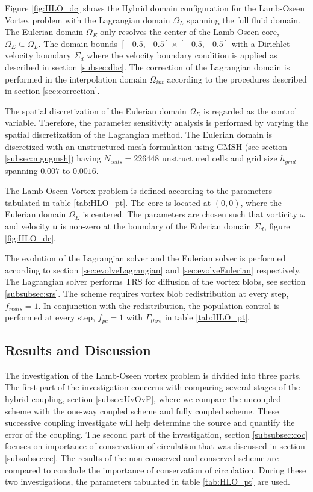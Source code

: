 Figure \ref{fig:HLO_dc} shows the Hybrid domain configuration for the Lamb-Oseen Vortex problem with the Lagrangian domain $\Omega_L$ spanning the full fluid domain. The Eulerian domain $\Omega_E$ only resolves the center of the Lamb-Oseen core, $\Omega_E \subseteq \Omega_L$. The domain bounds $[-0.5,-0.5] \times [-0.5,-0.5]$ with a Dirichlet velocity boundary $\Sigma_d$ where the velocity boundary condition is applied as described in section 
\ref{subsec:dbc}. The correction of the Lagrangian domain is performed in the interpolation domain $\Omega_{int}$ according to the procedures described in section \ref{sec:correction}.

The spatial discretization of the Eulerian domain $\Omega_E$ is regarded as the control variable. Therefore, the parameter sensitivity analysis is performed by varying the spatial discretization of the Lagrangian method. The Eulerian domain is discretized with an unstructured mesh formulation using GMSH (see section \ref{subsec:mgugmsh}) having $N_{cells} = 226448$ unstructured cells and grid size $h_{grid}$ spanning $0.007$ to $0.0016$. 

The Lamb-Oseen Vortex problem is defined according to the parameters tabulated in table \ref{tab:HLO_pt}. The core is located at $(0,0)$, where the Eulerian domain $\Omega_E$ is centered. The parameters are chosen such that vorticity $\omega$ and velocity $\mathbf{u}$ is non-zero at the boundary of the Eulerian domain $\Sigma_d$, figure \ref{fig:HLO_dc}. 

The evolution of the Lagrangian solver and the Eulerian solver is performed according to section \ref{sec:evolveLagrangian} and \ref{sec:evolveEulerian} respectively. The Lagrangian solver performs TRS for diffusion of the vortex blobs, see section \ref{subsubsec:srs}. The scheme requires vortex blob redistribution at every step, $f_{redis} = 1$. In conjunction with the redistribution, the population control is performed at every step, $f_{pc}=1$ with $\Gamma_{thre}$ in table \ref{tab:HLO_pt}. 


\subsection{Results and Discussion}

The investigation of the Lamb-Oseen vortex problem is divided into three parts. The first part of the investigation concerns with comparing several stages of the hybrid coupling, section \ref{subsec:UvOvF}, where we compare the uncoupled scheme with the one-way coupled scheme and fully coupled scheme. These successive coupling investigate will help determine the source and quantify the error of the coupling. The second part of the investigation, section \ref{subsubsec:coc} focuses on importance of conservation of circulation that was discussed in section \ref{subsubsec:cc}. The results of the non-conserved and conserved scheme are compared to conclude the importance of conservation of circulation. During these two investigations, the parameters tabulated in table \ref{tab:HLO_pt} are used.

